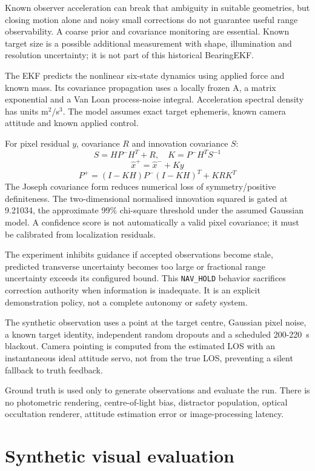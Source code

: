 \documentclass[11pt,a4paper]{article}
\begin{document}
Known observer acceleration can break that ambiguity in suitable geometries, but closing motion alone and noisy small corrections do not guarantee useful range observability. A coarse prior and covariance monitoring are essential. Known target size is a possible additional measurement with shape, illumination and resolution uncertainty; it is not part of this historical BearingEKF.

The EKF predicts the nonlinear six-state dynamics using applied force and known mass. Its covariance propagation uses a locally frozen A, a matrix exponential and a Van Loan process-noise integral. Acceleration spectral density has units m$^2$/s$^3$. The model assumes exact target ephemeris, known camera attitude and known applied control.

For pixel residual $y$, covariance $R$ and innovation covariance $S$:
\[ S = H P^{-} H^{T} + R, \quad K = P^{-} H^{T} S^{-1} \]
\[ \hat{x}^{+} = \hat{x}^{-} + K y \]
\[ P^{+} = (I - KH) P^{-} (I - KH)^{T} + K R K^{T} \]
The Joseph covariance form reduces numerical loss of symmetry/positive definiteness. The two-dimensional normalised innovation squared is gated at 9.21034, the approximate 99\% chi-square threshold under the assumed Gaussian model. A confidence score is not automatically a valid pixel covariance; it must be calibrated from localization residuals.

The experiment inhibits guidance if accepted observations become stale, predicted transverse uncertainty becomes too large or fractional range uncertainty exceeds its configured bound. This \texttt{NAV\_HOLD} behavior sacrifices correction authority when information is inadequate. It is an explicit demonstration policy, not a complete autonomy or safety system.

The synthetic observation uses a point at the target centre, Gaussian pixel noise, a known target identity, independent random dropouts and a scheduled 200-220~s blackout. Camera pointing is computed from the estimated LOS with an instantaneous ideal attitude servo, not from the true LOS, preventing a silent fallback to truth feedback.

Ground truth is used only to generate observations and evaluate the run. There is no photometric rendering, centre-of-light bias, distractor population, optical occultation renderer, attitude estimation error or image-processing latency.

\section{Synthetic visual evaluation}
\end{document}
